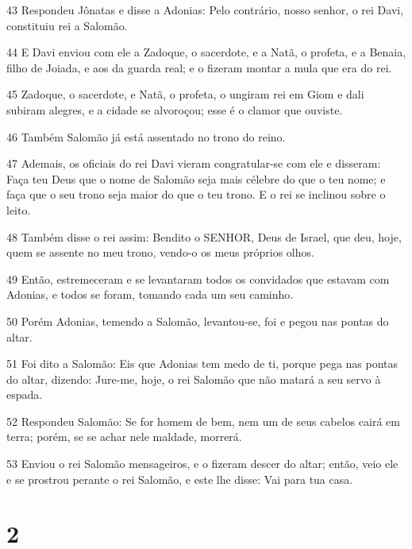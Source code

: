 \par 43 Respondeu Jônatas e disse a Adonias: Pelo contrário, nosso senhor, o rei Davi, constituiu rei a Salomão.
\par 44 E Davi enviou com ele a Zadoque, o sacerdote, e a Natã, o profeta, e a Benaia, filho de Joiada, e aos da guarda real; e o fizeram montar a mula que era do rei.
\par 45 Zadoque, o sacerdote, e Natã, o profeta, o ungiram rei em Giom e dali subiram alegres, e a cidade se alvoroçou; esse é o clamor que ouviste.
\par 46 Também Salomão já está assentado no trono do reino.
\par 47 Ademais, os oficiais do rei Davi vieram congratular-se com ele e disseram: Faça teu Deus que o nome de Salomão seja mais célebre do que o teu nome; e faça que o seu trono seja maior do que o teu trono. E o rei se inclinou sobre o leito.
\par 48 Também disse o rei assim: Bendito o SENHOR, Deus de Israel, que deu, hoje, quem se assente no meu trono, vendo-o os meus próprios olhos.
\par 49 Então, estremeceram e se levantaram todos os convidados que estavam com Adonias, e todos se foram, tomando cada um seu caminho.
\par 50 Porém Adonias, temendo a Salomão, levantou-se, foi e pegou nas pontas do altar.
\par 51 Foi dito a Salomão: Eis que Adonias tem medo de ti, porque pega nas pontas do altar, dizendo: Jure-me, hoje, o rei Salomão que não matará a seu servo à espada.
\par 52 Respondeu Salomão: Se for homem de bem, nem um de seus cabelos cairá em terra; porém, se se achar nele maldade, morrerá.
\par 53 Enviou o rei Salomão mensageiros, e o fizeram descer do altar; então, veio ele e se prostrou perante o rei Salomão, e este lhe disse: Vai para tua casa.

\chapter{2}

